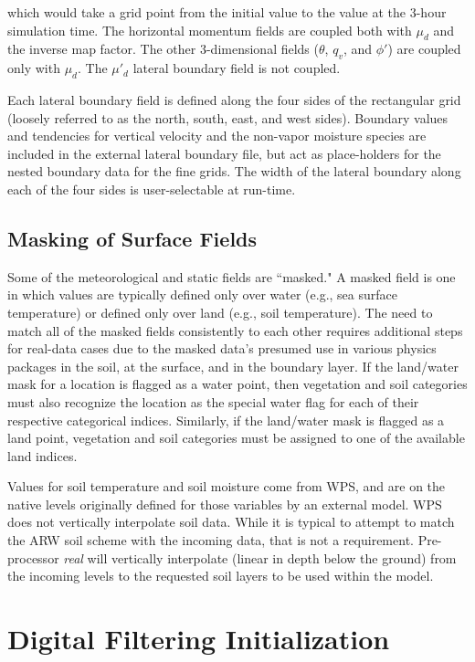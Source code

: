 \noindent which would take a grid point from the initial value to the value at the 3-hour simulation time. 
The horizontal momentum fields are coupled both with  $\mu_d$ and the inverse map factor.  The 
other 3-dimensional fields ($\theta$, $q_v$, and $\phi'$) are coupled only with $\mu_d$.
The $\mu'_d$ lateral boundary field is not coupled.

Each lateral boundary field
is defined along the four sides of the 
rectangular grid (loosely referred to as the north, south, east, and west sides).  
Boundary values and tendencies for vertical velocity and the non-vapor moisture species are included
in the external lateral boundary file, but act as
place-holders for the nested boundary data for the fine grids.
The width of the lateral
boundary along each of the four sides is user-selectable at run-time.

\subsection{Masking of Surface Fields}

Some of the meteorological and static fields are ``masked."  A masked field is one in which
values are typically defined only over water (e.g., sea surface temperature) or defined
only over land (e.g., soil temperature).
The need to match all of the masked fields consistently to each other requires additional steps
for real-data cases due to the masked data's presumed use in various physics packages in the soil, 
at the surface, and in the boundary layer.
If the land/water
mask for a location is flagged as a water point, then vegetation and soil categories must also
recognize the location as the special water flag for each of their respective categorical indices.  
Similarly, if the land/water mask is flagged as a land point, vegetation and soil
categories must be assigned to one of the available land indices.

Values for soil temperature and soil moisture come from WPS, and are on the 
native levels originally defined for those variables
by an external model.  WPS does not vertically interpolate
soil data.  While it is typical to attempt to match the ARW soil scheme with
the incoming data, that is not a requirement.  Pre-processor {\it real} will vertically interpolate 
(linear in depth below the ground) from the incoming levels to the requested soil layers to be
used within the model.

\section{Digital Filtering Initialization}

